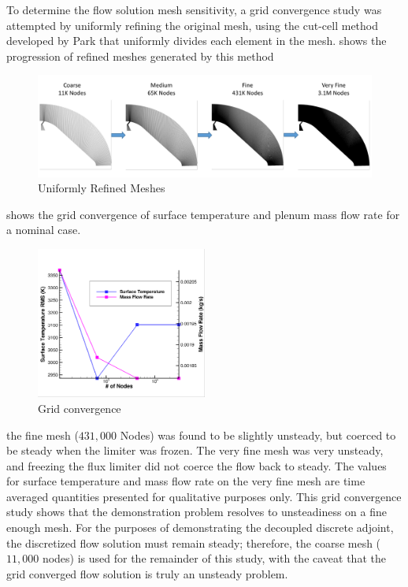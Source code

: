 To determine the flow solution mesh sensitivity, a grid convergence study was
attempted by uniformly refining the original mesh, using the cut-cell method
developed by Park\cite{???} that uniformly divides each element in the mesh.
 shows the progression of refined meshes generated by
this method
\begin{figure}[h]
  \centering
  \includegraphics[width=\textwidth]{figures/mesh-progression.png}
  \caption{Uniformly Refined Meshes}
  \label{fig:mesh-refined}
\end{figure}
 shows the grid convergence of surface temperature
and plenum mass flow rate for a nominal case.
\begin{figure}[h]
  \centering
  \includegraphics[width=0.5\textwidth]{figures/t-m-conv.png}
  \caption{Grid convergence }
  \label{fig:grid-convergence}
\end{figure}
the fine mesh ($431,000$ Nodes) was found to be slightly unsteady, but coerced
to be steady when the limiter was frozen.  The very fine mesh was very unsteady,
and freezing the flux limiter did not coerce the flow back to steady.  The
values for surface temperature and mass flow rate on the very fine mesh are time
averaged quantities presented for qualitative purposes only.  This grid
convergence study shows that the demonstration problem resolves to unsteadiness
on a fine enough mesh.  For the purposes of demonstrating the decoupled
discrete adjoint, the discretized flow solution must remain steady; therefore,
the coarse mesh ($11,000$ nodes) is used for the remainder of this study, with
the caveat that the grid converged flow solution is truly an unsteady problem.

